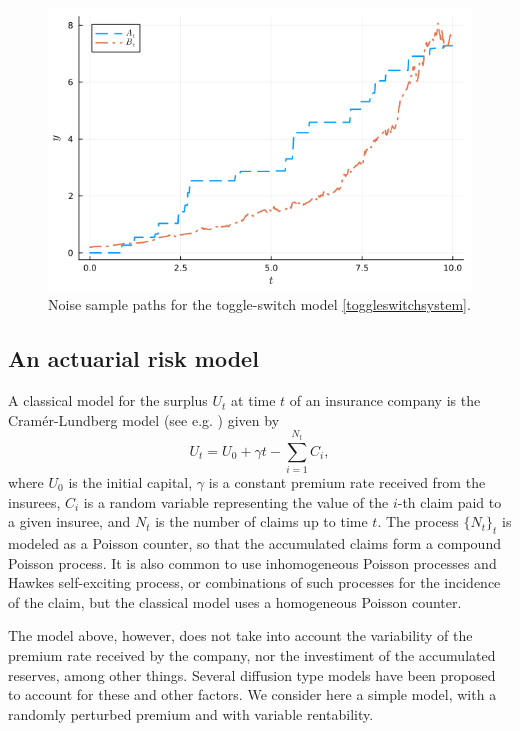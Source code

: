 \documentclass[reqno,12pt]{amsart}
\theoremstyle{plain} %
\theoremstyle{definition} %
\begin{document}
\begin{figure}[htb]
    \includegraphics[scale=0.6]{img/noises_toggleswitch.png}
    \caption{Noise sample paths for the toggle-switch model \eqref{toggleswitchsystem}.}
    \label{figtoggleswitchnoise}
\end{figure}

\subsection{An actuarial risk model}

A classical model for the surplus $U_t$ at time $t$ of an insurance company is the Cram\'er-Lundberg model (see e.g. \cite{GerberShiu1998}) given by
\[
  U_t = U_0 + \gamma t - \sum_{i=1}^{N_t} C_i,
\]
where $U_0$ is the initial capital, $\gamma$ is a constant premium rate received from the insurees, $C_i$ is a random variable representing the value of the $i$-th claim paid to a given insuree, and $N_t$ is the number of claims up to time $t$. The process $\{N_t\}_t$ is modeled as a Poisson counter, so that the accumulated claims form a compound Poisson process. It is also common to use inhomogeneous Poisson processes and Hawkes self-exciting process, or combinations of such processes for the incidence of the claim, but the classical model uses a homogeneous Poisson counter.

The model above, however, does not take into account the variability of the premium rate received by the company, nor the investiment of the accumulated reserves, among other things. Several diffusion type models have been proposed to account for these and other factors. We consider here a simple model, with a randomly perturbed premium and with variable rentability.
\end{document}
